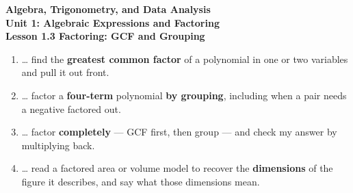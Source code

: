 \documentclass[10pt]{article}
\begin{document}
\vspace{-0.8in}

\begin{center}
  {\color{white}\textbf{\LARGE Algebra, Trigonometry, and Data Analysis}}\\[4pt]
  {\color{mistmid}\large\textbf{Unit 1: Algebraic Expressions and Factoring}}\\[6pt]
  {\color{white}\textbf{\large Lesson 1.3 \quad Factoring: GCF and Grouping}}
\end{center}

\vspace{0.22in}
\namedateperiod
\vspace{0.18in}

\begin{learningtargetbox}
\small
\begin{enumerate}[leftmargin=1.5em, itemsep=5pt]
  \item \ldots{} find the \textbf{greatest common factor} of a polynomial in one or two variables
        and pull it out front.
  \item \ldots{} factor a \textbf{four-term} polynomial \textbf{by grouping}, including when a pair
        needs a negative factored out.
  \item \ldots{} factor \textbf{completely} --- GCF first, then group --- and check my answer by
        multiplying back.
  \item \ldots{} read a factored area or volume model to recover the \textbf{dimensions} of the
        figure it describes, and say what those dimensions mean.
\end{enumerate}
\end{learningtargetbox}

\vspace{0.14in}
\end{document}
